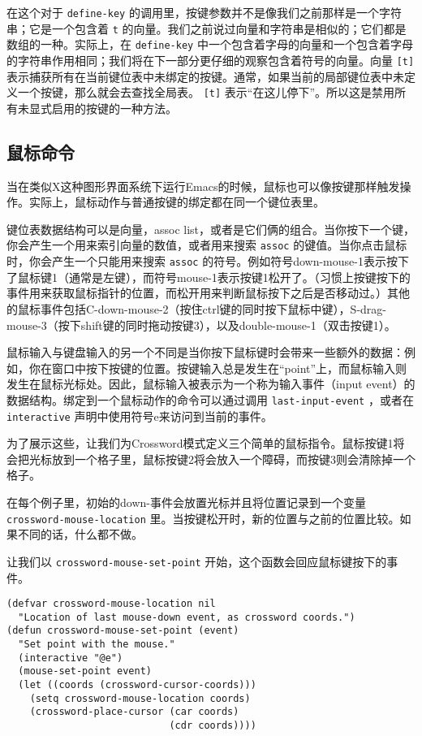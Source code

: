 在这个对于 \texttt{define-key} 的调用里，按键参数并不是像我们之前那样是一个字符串；它是一个包含着 \texttt{t} 的向量。我们之前说过向量和字符串是相似的；它们都是数组的一种。实际上，在 \texttt{define-key} 中一个包含着字母的向量和一个包含着字母的字符串作用相同；我们将在下一部分更仔细的观察包含着符号的向量。向量 \texttt{[t]} 表示捕获所有在当前键位表中未绑定的按键。通常，如果当前的局部键位表中未定义一个按键，那么就会去查找全局表。 \texttt{[t]} 表示“在这儿停下”。所以这是禁用所有未显式启用的按键的一种方法。

\subsection{鼠标命令}
\label{section:10-Mouse-Commands}

当在类似X这种图形界面系统下运行Emacs的时候，鼠标也可以像按键那样触发操作。实际上，鼠标动作与普通按键的绑定都在同一个键位表里。

键位表数据结构可以是向量，assoc list，或者是它们俩的组合。当你按下一个键，你会产生一个用来索引向量的数值，或者用来搜索 \texttt{assoc} 的键值。当你点击鼠标时，你会产生一个只能用来搜索 \texttt{assoc} 的符号。例如符号down-mouse-1表示按下了鼠标键1（通常是左键），而符号mouse-1表示按键1松开了。（习惯上按键按下的事件用来获取鼠标指针的位置，而松开用来判断鼠标按下之后是否移动过。）其他的鼠标事件包括C-down-mouse-2（按住ctrl键的同时按下鼠标中键），S-drag-mouse-3（按下shift键的同时拖动按键3），以及double-mouse-1（双击按键1）。

鼠标输入与键盘输入的另一个不同是当你按下鼠标键时会带来一些额外的数据：例如，你在窗口中按下按键的位置。按键输入总是发生在“point”上，而鼠标输入则发生在鼠标光标处。因此，鼠标输入被表示为一个称为输入事件（input event）的数据结构。绑定到一个鼠标动作的命令可以通过调用 \texttt{last-input-event} ，或者在 \texttt{interactive} 声明中使用符号e来访问到当前的事件。

为了展示这些，让我们为Crossword模式定义三个简单的鼠标指令。鼠标按键1将会把光标放到一个格子里，鼠标按键2将会放入一个障碍，而按键3则会清除掉一个格子。

在每个例子里，初始的down-事件会放置光标并且将位置记录到一个变量 \texttt{crossword-mouse-location} 里。当按键松开时，新的位置与之前的位置比较。如果不同的话，什么都不做。

让我们以 \texttt{crossword-mouse-set-point} 开始，这个函数会回应鼠标键按下的事件。

\begin{verbatim}
(defvar crossword-mouse-location nil
  "Location of last mouse-down event, as crossword coords.")
(defun crossword-mouse-set-point (event)
  "Set point with the mouse."
  (interactive "@e")
  (mouse-set-point event)
  (let ((coords (crossword-cursor-coords)))
    (setq crossword-mouse-location coords)
    (crossword-place-cursor (car coords)
                            (cdr coords))))
\end{verbatim}

